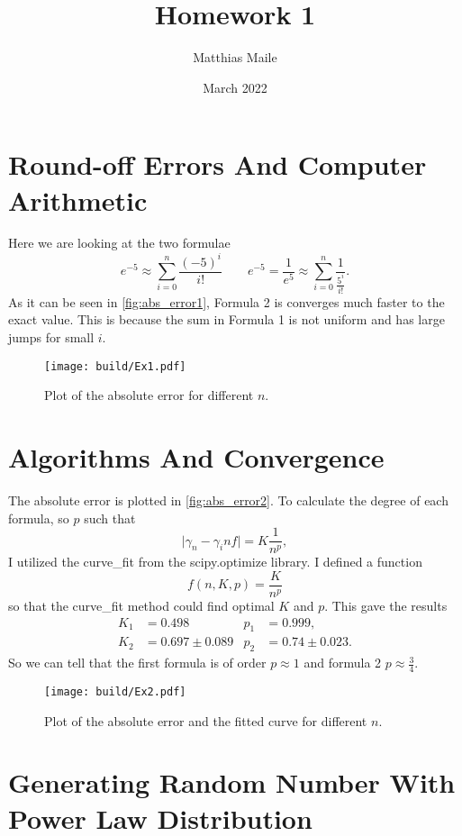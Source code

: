 \documentclass{article}
\author{Matthias Maile}
\date{March 2022}
\title{Homework 1}
\begin{document}
\maketitle
\tableofcontents

\section{Round-off Errors And Computer Arithmetic}
\label{sec:Round-off errors and Computer Arithmetic}
Here we are looking at the two formulae
\[
  e^{-5} \approx \sum_{i=0}^n \frac{(-5)^i}{i!}
  \qquad
  e^{-5} = \frac{1}{e^5} \approx \sum_{i=0}^n \frac{1}{\frac{5^i}{i!}}.
\]
As it can be seen in \autoref{fig:abs_error1}, Formula 2 is converges much faster 
to the exact value. This is because the sum in Formula 1 is not uniform and has 
large jumps for small $i$.


\begin{figure}[H]
	\centering
	\texttt{[image: build/Ex1.pdf]}
	\caption{Plot of the absolute error for different $n$.}
	\label{fig:abs_error1}
\end{figure}

\section{Algorithms And Convergence}
\label{sec:Algorithms and Convergence}
The absolute error is plotted in \autoref{fig:abs_error2}. To calculate the degree of each formula, so 
$p$ such that
\[
  \vert \gamma_n - \gamma_inf \vert = K \frac{1}{n^p},
\]
I utilized the curve\_fit from the scipy.optimize library. I defined a function
\[
  f(n, K, p) = \frac{K}{n^p}
\]
so that the curve\_fit method could find optimal $K$ and $p$. This gave the results
\begin{align}
  K_1 &= 0.498 & p_1 &= 0.999, \\
  K_2 &= 0.697 \pm 0.089 & p_2 &= 0.74 \pm 0.023.
\end{align}
So we can tell that the first formula is of order $p\approx1$ and formula 2 $p\approx \frac{3}{4}$.

\begin{figure}[H]
	\centering
	\texttt{[image: build/Ex2.pdf]}
	\caption{Plot of the absolute error and the fitted curve for different $n$.}
	\label{fig:abs_error2}
\end{figure}


\section{Generating Random Number With Power Law Distribution}
\label{sec:Generating Random Number With Power Law Distribution}
\end{document}

